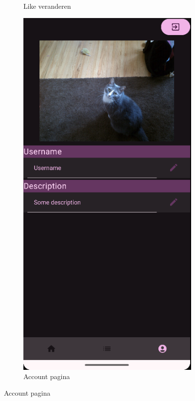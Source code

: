\documentclass{report}
\begin{document}
\begin{figure}[h]
\begin{subfigure}[b]{0.32\textwidth}
        \caption{Like veranderen}
    \end{subfigure}
    \hfill
    \begin{subfigure}[b]{0.32\textwidth}
        \includegraphics[width=\textwidth]{DEMO_Acc.png} 
        \caption{Account pagina}
    \end{subfigure}

\end{figure}
\end{document}
